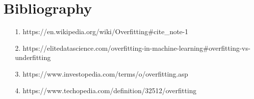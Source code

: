 \documentclass{article}
\begin{document}
\section{Bibliography}

    \begin{itemize}
        
        \item[1.] https://en.wikipedia.org/wiki/Overfitting#cite\_note-1
        \item[2.] https://elitedatascience.com/overfitting-in-machine-learning#overfitting-vs-underfitting
        \item[3.] https://www.investopedia.com/terms/o/overfitting.asp
        \item[4.] https://www.techopedia.com/definition/32512/overfitting
        
    \end{itemize}
\end{document}
